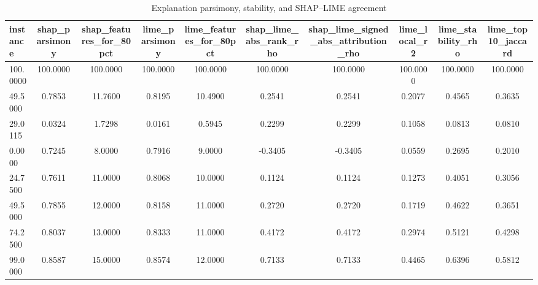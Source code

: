 \begin{table}
\centering
\caption{Explanation parsimony, stability, and SHAP--LIME agreement}
\label{tab:explanation_quality}
\begin{tabular}{lccccccccc}
\toprule
instance & shap_parsimony & shap_features_for_80pct & lime_parsimony & lime_features_for_80pct & shap_lime_abs_rank_rho & shap_lime_signed_abs_attribution_rho & lime_local_r2 & lime_stability_rho & lime_top10_jaccard \\
\midrule
100.0000 & 100.0000 & 100.0000 & 100.0000 & 100.0000 & 100.0000 & 100.0000 & 100.0000 & 100.0000 & 100.0000 \\
49.5000 & 0.7853 & 11.7600 & 0.8195 & 10.4900 & 0.2541 & 0.2541 & 0.2077 & 0.4565 & 0.3635 \\
29.0115 & 0.0324 & 1.7298 & 0.0161 & 0.5945 & 0.2299 & 0.2299 & 0.1058 & 0.0813 & 0.0810 \\
0.0000 & 0.7245 & 8.0000 & 0.7916 & 9.0000 & -0.3405 & -0.3405 & 0.0559 & 0.2695 & 0.2010 \\
24.7500 & 0.7611 & 11.0000 & 0.8068 & 10.0000 & 0.1124 & 0.1124 & 0.1273 & 0.4051 & 0.3056 \\
49.5000 & 0.7855 & 12.0000 & 0.8158 & 11.0000 & 0.2720 & 0.2720 & 0.1719 & 0.4622 & 0.3651 \\
74.2500 & 0.8037 & 13.0000 & 0.8333 & 11.0000 & 0.4172 & 0.4172 & 0.2974 & 0.5121 & 0.4298 \\
99.0000 & 0.8587 & 15.0000 & 0.8574 & 12.0000 & 0.7133 & 0.7133 & 0.4465 & 0.6396 & 0.5812 \\
\bottomrule
\end{tabular}
\end{table}
